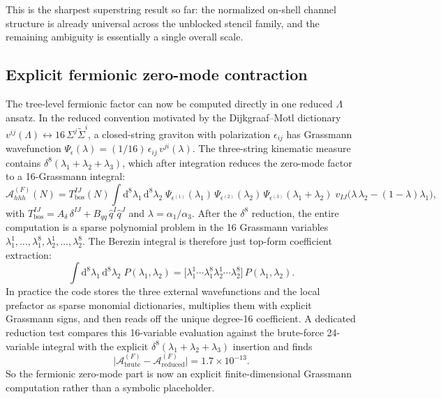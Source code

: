 \documentclass[11pt]{article}
\newcommand{\dd}{\mathrm{d}}
\begin{document}
This is the sharpest superstring result so far: the normalized on-shell channel structure is already universal across the unblocked stencil family, and the remaining ambiguity is essentially a single overall scale.

\subsection{Explicit fermionic zero-mode contraction}

The tree-level fermionic factor can now be computed directly in one reduced $\Lambda$ ansatz. In the reduced convention motivated by the Dijkgraaf--Motl dictionary $v^{ij}(\Lambda) \leftrightarrow 16\,\Sigma^j\widetilde\Sigma^i$, a closed-string graviton with polarization $\epsilon_{ij}$ has Grassmann wavefunction $\Psi_\epsilon(\lambda) = (1/16)\,\epsilon_{ij}\,v^{ji}(\lambda)$. The three-string kinematic measure contains $\delta^8(\lambda_1 + \lambda_2 + \lambda_3)$, which after integration reduces the zero-mode factor to a 16-Grassmann integral:
\begin{equation}
\mathcal{A}^{(F)}_{hhh}(N) = T_{\mathrm{bos}}^{IJ}(N)
\int\!\dd^8\lambda_1\,\dd^8\lambda_2\;
\Psi_{\epsilon^{(1)}}(\lambda_1)\,
\Psi_{\epsilon^{(2)}}(\lambda_2)\,
\Psi_{\epsilon^{(3)}}(\lambda_1 + \lambda_2)\;
v_{IJ}\!\bigl(\lambda\,\lambda_2 - (1-\lambda)\lambda_1\bigr),
\label{eq:fermionic-integral}
\end{equation}
with $T_{\mathrm{bos}}^{IJ} = A_\delta\,\delta^{IJ} + B_{qq}\,\hat q^I\hat q^J$ and $\lambda = \alpha_1/\alpha_3$. After the $\delta^8$ reduction, the entire computation is a sparse polynomial problem in the 16 Grassmann variables $\lambda_1^1,\dots,\lambda_1^8,\lambda_2^1,\dots,\lambda_2^8$. The Berezin integral is therefore just top-form coefficient extraction:
\begin{equation}
\int\!\dd^8\lambda_1\,\dd^8\lambda_2\;P(\lambda_1,\lambda_2)
=
\bigl[\lambda_1^1\cdots\lambda_1^8\lambda_2^1\cdots\lambda_2^8\bigr]\,
P(\lambda_1,\lambda_2).
\label{eq:ferm-top-form}
\end{equation}
In practice the code stores the three external wavefunctions and the local prefactor as sparse monomial dictionaries, multiplies them with explicit Grassmann signs, and then reads off the unique degree-16 coefficient. A dedicated reduction test compares this 16-variable evaluation against the brute-force 24-variable integral with the explicit $\delta^8(\lambda_1+\lambda_2+\lambda_3)$ insertion and finds
\begin{equation}
\bigl|\mathcal{A}^{(F)}_{\mathrm{brute}}-\mathcal{A}^{(F)}_{\mathrm{reduced}}\bigr|
=
1.7\times 10^{-13}.
\label{eq:ferm-reduction-check}
\end{equation}
So the fermionic zero-mode part is now an explicit finite-dimensional Grassmann computation rather than a symbolic placeholder.
\end{document}
